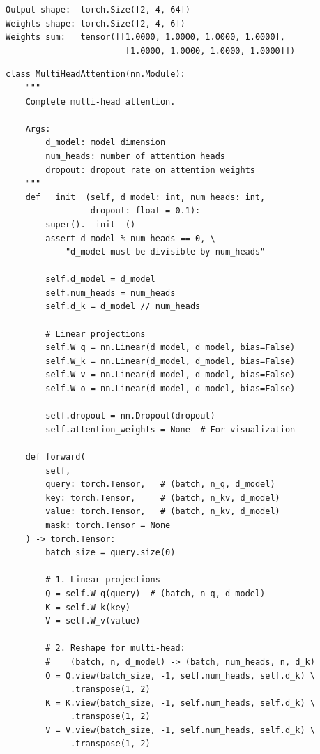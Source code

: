 \begin{codeoutput}
\begin{verbatim}
Output shape:  torch.Size([2, 4, 64])
Weights shape: torch.Size([2, 4, 6])
Weights sum:   tensor([[1.0000, 1.0000, 1.0000, 1.0000],
                        [1.0000, 1.0000, 1.0000, 1.0000]])
\end{verbatim}
\end{codeoutput}

\begin{codeblock}[title=\textbf{Complete Multi-Head Attention}]
\begin{verbatim}
class MultiHeadAttention(nn.Module):
    """
    Complete multi-head attention.

    Args:
        d_model: model dimension
        num_heads: number of attention heads
        dropout: dropout rate on attention weights
    """
    def __init__(self, d_model: int, num_heads: int,
                 dropout: float = 0.1):
        super().__init__()
        assert d_model % num_heads == 0, \
            "d_model must be divisible by num_heads"

        self.d_model = d_model
        self.num_heads = num_heads
        self.d_k = d_model // num_heads

        # Linear projections
        self.W_q = nn.Linear(d_model, d_model, bias=False)
        self.W_k = nn.Linear(d_model, d_model, bias=False)
        self.W_v = nn.Linear(d_model, d_model, bias=False)
        self.W_o = nn.Linear(d_model, d_model, bias=False)

        self.dropout = nn.Dropout(dropout)
        self.attention_weights = None  # For visualization

    def forward(
        self,
        query: torch.Tensor,   # (batch, n_q, d_model)
        key: torch.Tensor,     # (batch, n_kv, d_model)
        value: torch.Tensor,   # (batch, n_kv, d_model)
        mask: torch.Tensor = None
    ) -> torch.Tensor:
        batch_size = query.size(0)

        # 1. Linear projections
        Q = self.W_q(query)  # (batch, n_q, d_model)
        K = self.W_k(key)
        V = self.W_v(value)

        # 2. Reshape for multi-head:
        #    (batch, n, d_model) -> (batch, num_heads, n, d_k)
        Q = Q.view(batch_size, -1, self.num_heads, self.d_k) \
             .transpose(1, 2)
        K = K.view(batch_size, -1, self.num_heads, self.d_k) \
             .transpose(1, 2)
        V = V.view(batch_size, -1, self.num_heads, self.d_k) \
             .transpose(1, 2)


\end{verbatim}
\end{codeblock}
